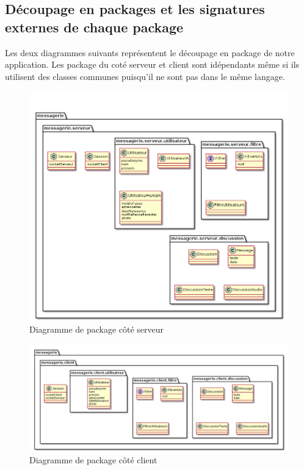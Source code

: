 \documentclass[a4paper,12pt]{article}
\begin{document}
	\newpage

	\subsection{Découpage en packages et les signatures externes de chaque package}
	Les deux diagrammes suivants représentent le découpage en package de notre application.
	Les package du coté serveur et client sont idépendants même si ils utilisent des classes communes puisqu'il ne sont pas dans le même langage.
	\begin{figure}[H]
		\centerline{\includegraphics[width=16.5cm]{../diagrammes/img/packageServeur.png}}
		\caption{Diagramme de package côté serveur}
	\end{figure}

	\begin{figure}[H]
		\centerline{\includegraphics[width=16.5cm]{../diagrammes/img/packageClient.png}}
		\caption{Diagramme de package côté client}
	\end{figure}
\end{document}
